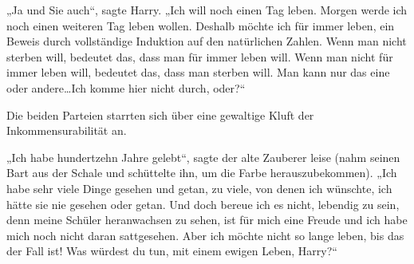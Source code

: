 „Ja und Sie auch“, sagte Harry. „Ich will noch einen Tag leben. Morgen werde ich noch einen weiteren Tag leben wollen. Deshalb möchte ich für immer leben, ein Beweis durch vollständige Induktion auf den natürlichen Zahlen. Wenn man nicht sterben will, bedeutet das, dass man für immer leben will. Wenn man nicht für immer leben will, bedeutet das, dass man sterben will. Man kann nur das eine oder andere…Ich komme hier nicht durch, oder?“

Die beiden Parteien starrten sich über eine gewaltige Kluft der Inkommensurabilität an.%

„Ich habe hundertzehn Jahre gelebt“, sagte der alte Zauberer leise (nahm seinen Bart aus der Schale und schüttelte ihn, um die Farbe herauszubekommen). „Ich habe sehr viele Dinge gesehen und getan, zu viele, von denen ich wünschte, ich hätte sie nie gesehen oder getan. Und doch bereue ich es nicht, lebendig zu sein, denn meine Schüler heranwachsen zu sehen, ist für mich eine Freude und ich habe mich noch nicht daran sattgesehen. Aber ich möchte nicht so lange leben, bis das der Fall ist! Was würdest du tun, mit einem ewigen Leben, Harry?“

